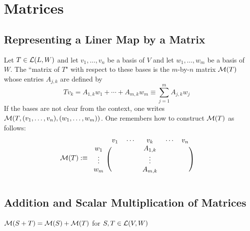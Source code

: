 \section{Matrices}
\subsection{Representing a Liner Map by a Matrix}

\setcounter{thm}{30}
\begin{mydef}
  \label{def: matrix of a linear map}
  Let $T \in \mathcal{L} (L,W)$ and let $v_1, \dots, v_n$ be a basis of $V$ and let $w_1, \dots, w_m$ be a basis of $W$. The ``matrix of $T$" with respect to these bases is the $m$-by-$n$ matrix $\mathcal{M}(T)$ whose entries $A_{j,k}$ are defined by
  \begin{equation}
    T v_k = A_{1,k} w_1 + \cdots + A_{m,k} w_m \equiv \sum_{j=1}^{m} A_{j,k} w_j
  \end{equation}
  If the bases are not clear from the context, one writes $\mathcal{M}(T, (v_1, \dots, v_n),(w_1, \dots, w_m))$. One remembers how to construct $\mathcal{M}(T)$ as follows:
  \begin{equation}
    \mathcal{M} (T) :\equiv
      \begin{blockarray}{cccccc}
                 & v_1 & \cdots & v_k     & \cdots & v_n \\
        \begin{block}{c(ccccc)}
          w_1    &     &        & A_{1,k} &        &     \\
          \vdots &     &        & \vdots  &        &     \\
          w_m    &     &        & A_{m,k} &        &     \\
        \end{block}
      \end{blockarray}
  \end{equation}
\end{mydef}

\subsection{Addition and Scalar Multiplication of Matrices}

\setcounter{thm}{34}
\begin{thm}
  $\mathcal{M}(S+T) = \mathcal{M}(S) + \mathcal{M}(T)$ for $S, T \in \mathcal{L} (V,W)$
\end{thm}

